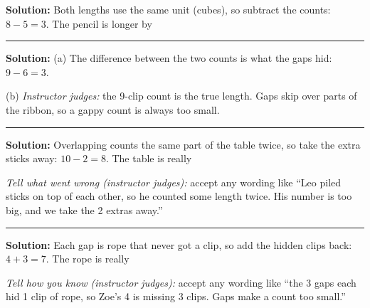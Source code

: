 \documentclass[12pt]{article}
\begin{document}



\textbf{Solution:} Both lengths use the same unit (cubes), so subtract the
counts: $8 - 5 = 3$. The pencil is longer by 

\vspace{0.2cm}\noindent\rule{\linewidth}{0.2pt}\vspace{0.1cm}


\textbf{Solution:} (a) The difference between the two counts is what the gaps
hid: $9 - 6 = 3$. 

(b) \emph{Instructor judges:} the 9-clip count is the true length. Gaps skip
over parts of the ribbon, so a gappy count is always too small.

\vspace{0.2cm}\noindent\rule{\linewidth}{0.2pt}\vspace{0.1cm}


\textbf{Solution:} Overlapping counts the same part of the table twice, so
take the extra sticks away: $10 - 2 = 8$. The table is really

\emph{Tell what went wrong (instructor judges):} accept any wording like
``Leo piled sticks on top of each other, so he counted some length twice.
His number is too big, and we take the 2 extras away.''

\vspace{0.2cm}\noindent\rule{\linewidth}{0.2pt}\vspace{0.1cm}


\textbf{Solution:} Each gap is rope that never got a clip, so add the hidden
clips back: $4 + 3 = 7$. The rope is really 

\emph{Tell how you know (instructor judges):} accept any wording like ``the
3 gaps each hid 1 clip of rope, so Zoe's 4 is missing 3 clips. Gaps make a
count too small.''
\end{document}
